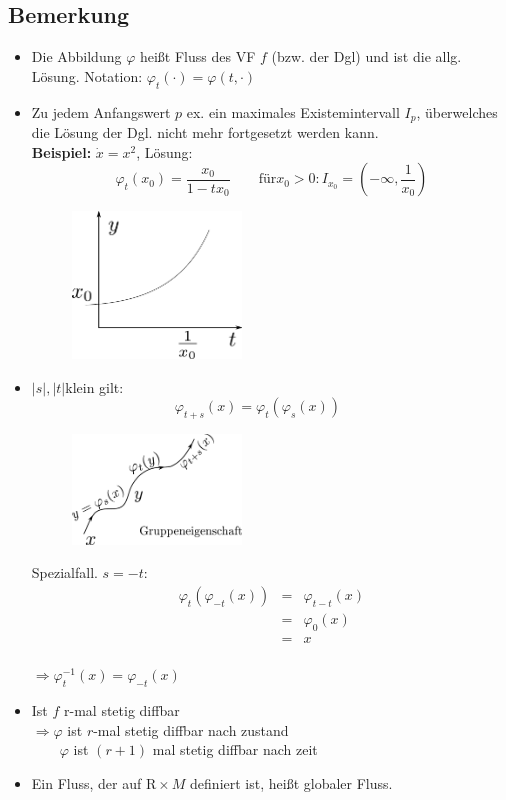 \documentclass[ngerman]{tudscrreprt}
\begin{document}
\subsection*{Bemerkung}
\begin{itemize}
\item Die Abbildung $\varphi$ heißt Fluss des VF $f$ (bzw. der Dgl) und ist die allg. Lösung. Notation: $\varphi_t(\cdot) = \varphi(t,\cdot)$
\item Zu jedem Anfangswert $p$ ex. ein maximales Existemintervall $I_p$, überwelches die Lösung der Dgl. nicht mehr fortgesetzt werden kann. \\ 
\textbf{Beispiel:} $\dot x = x^2$, Lösung: \begin{equation*}
\varphi_t(x_0) = \frac{x_0}{1-tx_0} \qquad \text{für} x_0 > 0: I_{x_0} = (-\infty,\frac{1}{x_0}) 
\end{equation*}
\begin{figure}[H]
\centering
\def\svgwidth{200pt} 
  \includegraphics[width=4.5cm]{image21.pdf}
\end{figure}
\item $|s|, |t|$klein gilt:
\begin{equation*}
\varphi_{t+s}(x) = \varphi_{t}(\varphi_s(x)) \qquad 
\end{equation*}
\begin{figure}[H]
\centering
\def\svgwidth{200pt} 
  \includegraphics[width=4.5cm]{image3.pdf}
\end{figure}
Spezialfall. $s= -t:$
\begin{equation*}
\begin{matrix}
\varphi_t(\varphi_{-t}(x)) &=& \varphi_{t-t}(x)\\ 
&=&\varphi_0(x)\\ 
&=&x
\end{matrix}
\end{equation*}\\ 
$\Rightarrow \varphi_t^{-1}(x) = \varphi_{-t}(x)$
\item Ist $f$ r-mal stetig diffbar \\
$\Rightarrow \varphi$ ist $r$-mal stetig diffbar nach zustand\\ 
$\qquad \varphi$ ist $(r+1)$ mal stetig diffbar nach zeit
\item Ein Fluss, der auf $\mathrm{R}\times M$ definiert ist, heißt globaler Fluss.
\end{itemize}
\end{document}
